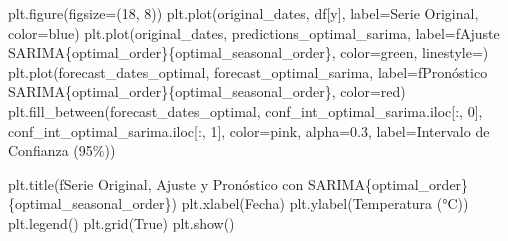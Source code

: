 \documentclass[
  11pt,
]{article}
\newenvironment{Shaded}{}{}
\newcommand{\DecValTok}[1]{\textcolor[rgb]{0.25,0.63,0.44}{#1}}
\newcommand{\FloatTok}[1]{\textcolor[rgb]{0.25,0.63,0.44}{#1}}
\newcommand{\NormalTok}[1]{#1}
\newcommand{\OperatorTok}[1]{\textcolor[rgb]{0.40,0.40,0.40}{#1}}
\newcommand{\SpecialCharTok}[1]{\textcolor[rgb]{0.25,0.44,0.63}{#1}}
\newcommand{\SpecialStringTok}[1]{\textcolor[rgb]{0.73,0.40,0.53}{#1}}
\newcommand{\StringTok}[1]{\textcolor[rgb]{0.25,0.44,0.63}{#1}}
\newcommand{\VariableTok}[1]{\textcolor[rgb]{0.10,0.09,0.49}{#1}}
\begin{document}
\begin{Shaded}
\begin{Highlighting}[]
\NormalTok{plt.figure(figsize}\OperatorTok{=}\NormalTok{(}\DecValTok{18}\NormalTok{, }\DecValTok{8}\NormalTok{))}
\NormalTok{plt.plot(original\_dates, df[}\StringTok{\textquotesingle{}y\textquotesingle{}}\NormalTok{], label}\OperatorTok{=}\StringTok{\textquotesingle{}Serie Original\textquotesingle{}}\NormalTok{, color}\OperatorTok{=}\StringTok{\textquotesingle{}blue\textquotesingle{}}\NormalTok{)}
\NormalTok{plt.plot(original\_dates, predictions\_optimal\_sarima, label}\OperatorTok{=}\SpecialStringTok{f\textquotesingle{}Ajuste SARIMA}\SpecialCharTok{\{}\NormalTok{optimal\_order}\SpecialCharTok{\}\{}\NormalTok{optimal\_seasonal\_order}\SpecialCharTok{\}}\SpecialStringTok{\textquotesingle{}}\NormalTok{, color}\OperatorTok{=}\StringTok{\textquotesingle{}green\textquotesingle{}}\NormalTok{, linestyle}\OperatorTok{=}\StringTok{\textquotesingle{}{-}{-}\textquotesingle{}}\NormalTok{)}
\NormalTok{plt.plot(forecast\_dates\_optimal, forecast\_optimal\_sarima, label}\OperatorTok{=}\SpecialStringTok{f\textquotesingle{}Pronóstico SARIMA}\SpecialCharTok{\{}\NormalTok{optimal\_order}\SpecialCharTok{\}\{}\NormalTok{optimal\_seasonal\_order}\SpecialCharTok{\}}\SpecialStringTok{\textquotesingle{}}\NormalTok{, color}\OperatorTok{=}\StringTok{\textquotesingle{}red\textquotesingle{}}\NormalTok{)}
\NormalTok{plt.fill\_between(forecast\_dates\_optimal,}
\NormalTok{                 conf\_int\_optimal\_sarima.iloc[:, }\DecValTok{0}\NormalTok{],}
\NormalTok{                 conf\_int\_optimal\_sarima.iloc[:, }\DecValTok{1}\NormalTok{],}
\NormalTok{                 color}\OperatorTok{=}\StringTok{\textquotesingle{}pink\textquotesingle{}}\NormalTok{, alpha}\OperatorTok{=}\FloatTok{0.3}\NormalTok{, label}\OperatorTok{=}\StringTok{\textquotesingle{}Intervalo de Confianza (95\%)\textquotesingle{}}\NormalTok{)}

\NormalTok{plt.title(}\SpecialStringTok{f\textquotesingle{}Serie Original, Ajuste y Pronóstico con SARIMA}\SpecialCharTok{\{}\NormalTok{optimal\_order}\SpecialCharTok{\}\{}\NormalTok{optimal\_seasonal\_order}\SpecialCharTok{\}}\SpecialStringTok{\textquotesingle{}}\NormalTok{)}
\NormalTok{plt.xlabel(}\StringTok{\textquotesingle{}Fecha\textquotesingle{}}\NormalTok{)}
\NormalTok{plt.ylabel(}\StringTok{\textquotesingle{}Temperatura (°C)\textquotesingle{}}\NormalTok{)}
\NormalTok{plt.legend()}
\NormalTok{plt.grid(}\VariableTok{True}\NormalTok{)}
\NormalTok{plt.show()}


\end{Highlighting}
\end{Shaded}
\end{document}
